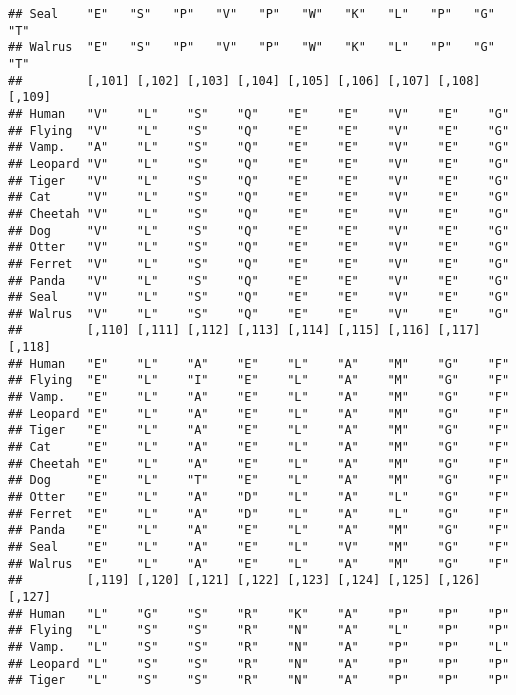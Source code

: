 \documentclass[]{article}
\begin{document}
\begin{verbatim}
## Seal    "E"   "S"   "P"   "V"   "P"   "W"   "K"   "L"   "P"   "G"   "T"   
## Walrus  "E"   "S"   "P"   "V"   "P"   "W"   "K"   "L"   "P"   "G"   "T"   
##         [,101] [,102] [,103] [,104] [,105] [,106] [,107] [,108] [,109]
## Human   "V"    "L"    "S"    "Q"    "E"    "E"    "V"    "E"    "G"   
## Flying  "V"    "L"    "S"    "Q"    "E"    "E"    "V"    "E"    "G"   
## Vamp.   "A"    "L"    "S"    "Q"    "E"    "E"    "V"    "E"    "G"   
## Leopard "V"    "L"    "S"    "Q"    "E"    "E"    "V"    "E"    "G"   
## Tiger   "V"    "L"    "S"    "Q"    "E"    "E"    "V"    "E"    "G"   
## Cat     "V"    "L"    "S"    "Q"    "E"    "E"    "V"    "E"    "G"   
## Cheetah "V"    "L"    "S"    "Q"    "E"    "E"    "V"    "E"    "G"   
## Dog     "V"    "L"    "S"    "Q"    "E"    "E"    "V"    "E"    "G"   
## Otter   "V"    "L"    "S"    "Q"    "E"    "E"    "V"    "E"    "G"   
## Ferret  "V"    "L"    "S"    "Q"    "E"    "E"    "V"    "E"    "G"   
## Panda   "V"    "L"    "S"    "Q"    "E"    "E"    "V"    "E"    "G"   
## Seal    "V"    "L"    "S"    "Q"    "E"    "E"    "V"    "E"    "G"   
## Walrus  "V"    "L"    "S"    "Q"    "E"    "E"    "V"    "E"    "G"   
##         [,110] [,111] [,112] [,113] [,114] [,115] [,116] [,117] [,118]
## Human   "E"    "L"    "A"    "E"    "L"    "A"    "M"    "G"    "F"   
## Flying  "E"    "L"    "I"    "E"    "L"    "A"    "M"    "G"    "F"   
## Vamp.   "E"    "L"    "A"    "E"    "L"    "A"    "M"    "G"    "F"   
## Leopard "E"    "L"    "A"    "E"    "L"    "A"    "M"    "G"    "F"   
## Tiger   "E"    "L"    "A"    "E"    "L"    "A"    "M"    "G"    "F"   
## Cat     "E"    "L"    "A"    "E"    "L"    "A"    "M"    "G"    "F"   
## Cheetah "E"    "L"    "A"    "E"    "L"    "A"    "M"    "G"    "F"   
## Dog     "E"    "L"    "T"    "E"    "L"    "A"    "M"    "G"    "F"   
## Otter   "E"    "L"    "A"    "D"    "L"    "A"    "L"    "G"    "F"   
## Ferret  "E"    "L"    "A"    "D"    "L"    "A"    "L"    "G"    "F"   
## Panda   "E"    "L"    "A"    "E"    "L"    "A"    "M"    "G"    "F"   
## Seal    "E"    "L"    "A"    "E"    "L"    "V"    "M"    "G"    "F"   
## Walrus  "E"    "L"    "A"    "E"    "L"    "A"    "M"    "G"    "F"   
##         [,119] [,120] [,121] [,122] [,123] [,124] [,125] [,126] [,127]
## Human   "L"    "G"    "S"    "R"    "K"    "A"    "P"    "P"    "P"   
## Flying  "L"    "S"    "S"    "R"    "N"    "A"    "L"    "P"    "P"   
## Vamp.   "L"    "S"    "S"    "R"    "N"    "A"    "P"    "P"    "L"   
## Leopard "L"    "S"    "S"    "R"    "N"    "A"    "P"    "P"    "P"   
## Tiger   "L"    "S"    "S"    "R"    "N"    "A"    "P"    "P"    "P"   

\end{verbatim}
\end{document}
